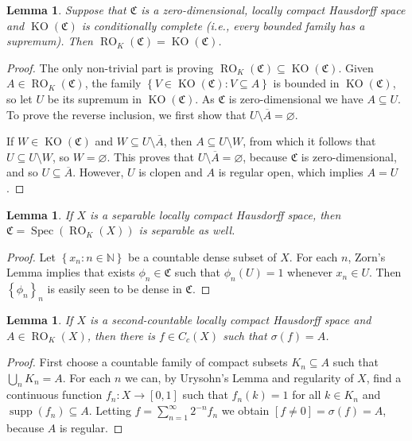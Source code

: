 \documentclass[letter,11pt]{amsart}
\theoremstyle{plain}		\newtheorem{theorem}[generalnumbering]{Theorem}
\theoremstyle{plain}		\newtheorem{corollary}[generalnumbering]{Corollary}
\theoremstyle{definition}		\newtheorem{definition}[generalnumbering]{Definition}
\theoremstyle{definition}		\newtheorem{example}[generalnumbering]{Example}
\theoremstyle{plain}		\newtheorem{proposition}[generalnumbering]{Proposition}
\theoremstyle{plain}		\newtheorem{lemma}[generalnumbering]{Lemma}
\theoremstyle{definition}
\DeclareMathOperator{\supp}{supp}
\begin{document}
\begin{lemma}
	\label{lemmawhenregularcompactopenareclopen}
	Suppose that $\mathfrak{C}$ is a zero-dimensional, locally compact Hausdorff space and $\operatorname{KO}(\mathfrak{C})$ is conditionally complete (i.e., every \emph{bounded} family has a supremum). Then $\operatorname{RO}_K(\mathfrak{C})=\operatorname{KO}(\mathfrak{C})$.
\end{lemma}
\begin{proof}
	The only non-trivial part is proving $\operatorname{RO}_K(\mathfrak{C})\subseteq\operatorname{KO}(\mathfrak{C})$. Given $A\in\operatorname{RO}_K(\mathfrak{C})$, the family $\left\{V\in\operatorname{KO}(\mathfrak{C}):V\subseteq A\right\}$ is bounded in $\operatorname{KO}(\mathfrak{C})$, so let $U$ be its supremum in $\operatorname{KO}(\mathfrak{C})$. As $\mathfrak{C}$ is zero-dimensional we have $A\subseteq U$. To prove the reverse inclusion, we first show that $U\setminus\overline{A}=\varnothing$.
	
	If $W\in\operatorname{KO}(\mathfrak{C})$ and $W\subseteq U\setminus\overline{A}$, then $A\subseteq  U\setminus W$, from which it follows that $U\subseteq U\setminus W$, so $W=\varnothing$. This proves that $U\setminus\overline{A}=\varnothing$, because $\mathfrak{C}$ is zero-dimensional, and so $U\subseteq\overline{A}$. However, $U$ is clopen and $A$ is regular open, which implies $A=U$.\qedhere
\end{proof}

\begin{lemma}\label{gprokseparableisseparable}
	If $X$ is a separable locally compact Hausdorff space, then $\mathfrak{C}=\operatorname{Spec}(\operatorname{RO}_K(X))$ is separable as well.
\end{lemma}
\begin{proof}
	Let $\left\{x_n:n\in\mathbb{N}\right\}$ be a countable dense subset of $X$. For each $n$, Zorn's Lemma implies that exists $\phi_n\in\mathfrak{C}$ such that $\phi_n(U)=1$ whenever $x_n\in U$. Then $\left\{\phi_n\right\}_n$ is easily seen to be dense in $\mathfrak{C}$.\qedhere
\end{proof}

\begin{lemma}\label{lemmaregularopeninsecondcountableissigma}
	If $X$ is a second-countable locally compact Hausdorff space and $A\in\operatorname{RO}_K(X)$, then there is $f\in C_c(X)$ such that $\sigma(f)=A$.
\end{lemma}
\begin{proof}
	First choose a countable family of compact subsets $K_n\subseteq A$ such that $\bigcup_nK_n=A$. For each $n$ we can, by Urysohn's Lemma and regularity of $X$, find a continuous function $f_n\colon X\to[0,1]$ such that $f_n(k)=1$ for all $k\in K_n$ and $\supp(f_n)\subseteq A$. Letting $f=\sum_{n=1}^\infty 2^{-n}f_n$ we obtain $[f\neq 0]=\sigma(f)=A$, because $A$ is regular.
\end{proof}
\end{document}

